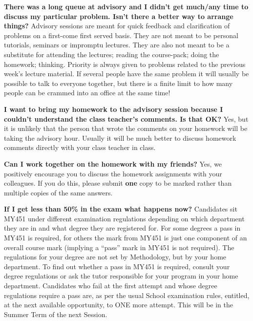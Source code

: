 \newpage
\textbf{There was a long queue at advisory and I didn't get much/any time to
discuss my particular problem. Isn't there a better way to arrange
things?} Advisory sessions are meant for quick feedback and clarification
of problems on a first-come first served basis. They are not meant to be
personal tutorials, seminars or impromptu lectures. They are also not
meant to be a substitute for attending the lectures; reading the
course-pack; doing the homework; thinking. Priority
is always given to problems related to the previous week's lecture
material. If several people have the same problem it will usually be
possible to talk to everyone together, but there is a finite limit to
how many people can be crammed into an office at the same time!

\textbf{I want to bring my homework to the advisory session because I
couldn't understand the class teacher's comments. Is that OK?} Yes, but
it is unlikely that the person that wrote the comments on your homework
will be taking the advisory hour. Usually it will be much better to
discuss homework comments directly with your class teacher in class.


\textbf{Can I work together on the homework with my friends?} Yes, we positively
encourage you to discuss the homework assignments with your colleagues.
If you do this, please submit \textbf{one} copy to be marked rather
than multiple copies of the same answers.

\textbf{If I get less than 50\%
in the exam what happens now?} Candidates sit
MY451 under different examination regulations depending on which
department they are in and what degree they are registered for.  For
some degrees a pass in MY451 is required, for others the mark from MY451
is just one component of an overall course mark (implying a ``pass'' mark
in MY451 is not required). The regulations for your degree are not set
by Methodology, but by your home department. To find out whether a pass in
MY451 is required, consult your degree regulations
or ask the tutor responsible for your program in your home
department. Candidates who fail at the first attempt and whose degree
regulations require a pass are, as per the usual School examination
rules, entitled, at the next available opportunity, to ONE more attempt.
This will be in the Summer Term of the next Session.

